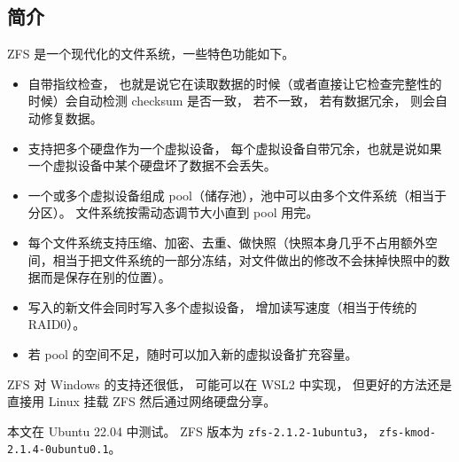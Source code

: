 

\subsection{简介}
ZFS 是一个现代化的文件系统，一些特色功能如下。
\begin{itemize}
\item 自带指纹检查， 也就是说它在读取数据的时候（或者直接让它检查完整性的时候）会自动检测 checksum 是否一致， 若不一致， 若有数据冗余， 则会自动修复数据。
\item 支持把多个硬盘作为一个虚拟设备， 每个虚拟设备自带冗余，也就是说如果一个虚拟设备中某个硬盘坏了数据不会丢失。
\item 一个或多个虚拟设备组成 pool（储存池），池中可以由多个文件系统（相当于分区）。 文件系统按需动态调节大小直到 pool 用完。
\item 每个文件系统支持压缩、加密、去重、做快照（快照本身几乎不占用额外空间，相当于把文件系统的一部分冻结，对文件做出的修改不会抹掉快照中的数据而是保存在别的位置）。
\item 写入的新文件会同时写入多个虚拟设备， 增加读写速度（相当于传统的 RAID0）。
\item 若 pool 的空间不足，随时可以加入新的虚拟设备扩充容量。
\end{itemize}

ZFS 对 Windows 的支持还很低， 可能可以在 WSL2 中实现， 但更好的方法还是直接用 Linux 挂载 ZFS 然后通过网络硬盘分享。

本文在 Ubuntu 22.04 中测试。 ZFS 版本为 \verb`zfs-2.1.2-1ubuntu3`， \verb`zfs-kmod-2.1.4-0ubuntu0.1`。

